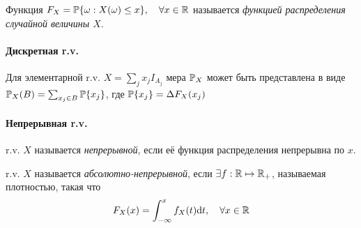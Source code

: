 Функция \(F_X = \mathbb P \{\omega: X(\omega) \leq x\}, \quad\forall x\in\mathbb R\)
называется \emph{функцией распределения случайной величины \(X\)}.

\paragraph{Дискретная
r.v.}\label{ux434ux438ux441ux43aux440ux435ux442ux43dux430ux44f-r.v.}

Для элементарной r.v. \(X = \sum_j x_j I_{A_j}\) мера \(\mathbb P_X\) может
быть представлена в виде \(\mathbb P_X (B) = \sum_{x_j\in B} \mathbb P\{x_j\}\), где
\(\mathbb P\{x_j\} = \Delta F_X(x_j)\)

\paragraph{Непрерывная
r.v.}\label{ux43dux435ux43fux440ux435ux440ux44bux432ux43dux430ux44f-r.v.}

r.v. \(X\) называется \emph{непрерывной}, если её функция распределения
непрерывна по \(x\).

r.v. \(X\) называется \emph{абсолютно-непрерывной}, если
\(\exists f: \mathbb R\mapsto\mathbb R_+\), называемая плотностью, такая что
\[F_X(x) = \int_{-\infty}^x f_X(t) \mathrm d t, \quad \forall x\in\mathbb R\]
